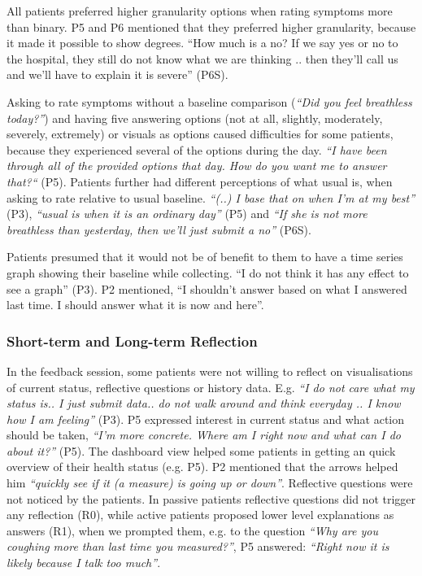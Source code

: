 All patients preferred higher granularity options when rating symptoms more than binary. P5 and P6 mentioned that they preferred higher granularity, because it made it possible to show degrees. “How much is a no? If we say yes or no to the hospital, they still do not know what we are thinking .. then they’ll call us and we’ll have to explain it is severe” (P6S).

Asking to rate symptoms without a baseline comparison (\textit{“Did you feel breathless today?”}) and having five answering options (not at all, slightly, moderately, severely, extremely) or visuals as options caused difficulties for some patients, because they experienced several of the options during the day. \textit{“I have been through all of the provided options that day. How do you want me to answer that?“} (P5). Patients further had different perceptions of what usual is, when asking to rate relative to usual baseline. \textit{“(..) I base that on when I’m at my best”} (P3), \textit{“usual is when it is an ordinary day”} (P5) and \textit{“If she is not more breathless than yesterday, then we’ll just submit a no”} (P6S).

Patients presumed that it would not be of benefit to them to have a time series graph showing their baseline while collecting. “I do not think it has any effect to see a graph” (P3). P2 mentioned, “I shouldn’t answer based on what I answered last time. I should answer what it is now and here”.

\subsubsection{Short-term and Long-term Reflection}
In the feedback session, some patients were not willing to reflect on visualisations of current status, reflective questions or history data. E.g. \textit{“I do not care what my status is.. I just submit data.. do not walk around and think everyday .. I know how I am feeling”} (P3). P5 expressed interest in current status and what action should be taken, \textit{“I’m more concrete. Where am I right now and what can I do about it?”} (P5). The dashboard view helped some patients in getting an quick overview of their health status (e.g. P5). P2 mentioned that the arrows helped him \textit{“quickly see if it (a measure) is going up or down”}. Reflective questions were not noticed by the patients. In passive patients reflective questions did not trigger any reflection (R0), while active patients proposed lower level explanations as answers (R1), when we prompted them, e.g. to the question \textit{“Why are you coughing more than last time you measured?”}, P5 answered: \textit{“Right now it is likely because I talk too much”}.

